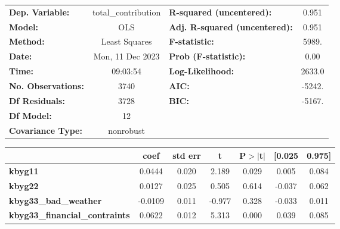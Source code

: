 \begin{center}
\begin{tabular}{lclc}
\toprule
\textbf{Dep. Variable:}                      & total\_contribution & \textbf{  R-squared (uncentered):}      &     0.951   \\
\textbf{Model:}                              &         OLS         & \textbf{  Adj. R-squared (uncentered):} &     0.951   \\
\textbf{Method:}                             &    Least Squares    & \textbf{  F-statistic:       }          &     5989.   \\
\textbf{Date:}                               &   Mon, 11 Dec 2023  & \textbf{  Prob (F-statistic):}          &     0.00    \\
\textbf{Time:}                               &       09:03:54      & \textbf{  Log-Likelihood:    }          &    2633.0   \\
\textbf{No. Observations:}                   &          3740       & \textbf{  AIC:               }          &    -5242.   \\
\textbf{Df Residuals:}                       &          3728       & \textbf{  BIC:               }          &    -5167.   \\
\textbf{Df Model:}                           &            12       & \textbf{                     }          &             \\
\textbf{Covariance Type:}                    &      nonrobust      & \textbf{                     }          &             \\
\bottomrule
\end{tabular}
\begin{tabular}{lcccccc}
                                             & \textbf{coef} & \textbf{std err} & \textbf{t} & \textbf{P$> |$t$|$} & \textbf{[0.025} & \textbf{0.975]}  \\
\midrule
\textbf{kbyg11}                              &       0.0444  &        0.020     &     2.189  &         0.029        &        0.005    &        0.084     \\
\textbf{kbyg22}                              &       0.0127  &        0.025     &     0.505  &         0.614        &       -0.037    &        0.062     \\
\textbf{kbyg33\_bad\_weather}                &      -0.0109  &        0.011     &    -0.977  &         0.328        &       -0.033    &        0.011     \\
\textbf{kbyg33\_financial\_contraints}       &       0.0622  &        0.012     &     5.313  &         0.000        &        0.039    &        0.085     \\

\end{tabular}
\end{center}
